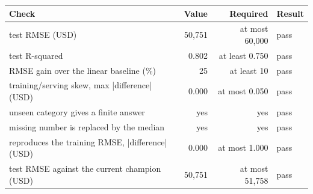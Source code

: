 \begin{tabular}{p{8cm}rrl}
\toprule
Check & Value & Required & Result \\
\midrule
test RMSE (USD) & 50,751 & at most 60,000 & pass \\
test R-squared & 0.802 & at least 0.750 & pass \\
RMSE gain over the linear baseline (\%) & 25 & at least 10 & pass \\
training/serving skew, max |difference| (USD) & 0.000 & at most 0.050 & pass \\
unseen category gives a finite answer & yes & yes & pass \\
missing number is replaced by the median & yes & yes & pass \\
reproduces the training RMSE, |difference| (USD) & 0.000 & at most 1.000 & pass \\
test RMSE against the current champion (USD) & 50,751 & at most 51,758 & pass \\
\bottomrule
\end{tabular}
